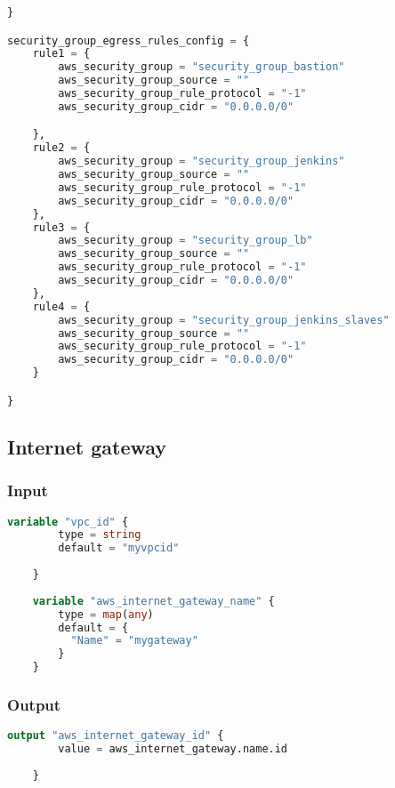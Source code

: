 \begin{lstlisting}[language=terraform]
}

security_group_egress_rules_config = {
    rule1 = {
        aws_security_group = "security_group_bastion"
        aws_security_group_source = ""
        aws_security_group_rule_protocol = "-1"
        aws_security_group_cidr = "0.0.0.0/0"

    },
    rule2 = {
        aws_security_group = "security_group_jenkins"
        aws_security_group_source = ""
        aws_security_group_rule_protocol = "-1"
        aws_security_group_cidr = "0.0.0.0/0"
    },
    rule3 = {
        aws_security_group = "security_group_lb"
        aws_security_group_source = ""
        aws_security_group_rule_protocol = "-1"
        aws_security_group_cidr = "0.0.0.0/0"
    },
    rule4 = {
        aws_security_group = "security_group_jenkins_slaves"
        aws_security_group_source = ""
        aws_security_group_rule_protocol = "-1"
        aws_security_group_cidr = "0.0.0.0/0"
    }

}
\end{lstlisting}

\subsection{
{Internet gateway}}
\label{sec:Internet gateway}

\subsubsection{
{Input}}
\label{sec:Input}

\begin{lstlisting}[language=terraform]
    variable "vpc_id" {
        type = string
        default = "myvpcid"
    
    }
    
    variable "aws_internet_gateway_name" {
        type = map(any)
        default = {
          "Name" = "mygateway" 
        }
    }
\end{lstlisting}

\subsubsection{
{Output}}
\label{sec:Output}

\begin{lstlisting}[language=terraform]
    output "aws_internet_gateway_id" {
        value = aws_internet_gateway.name.id
      
    }
\end{lstlisting}

